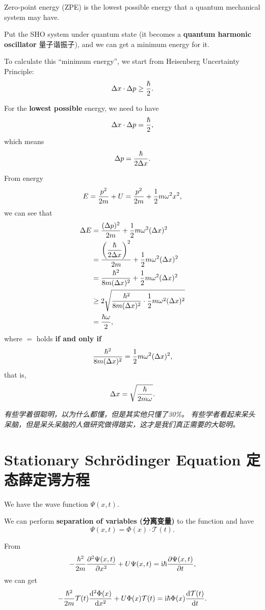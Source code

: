 Zero-point energy (ZPE) is the lowest possible energy that a quantum mechanical system may have.

Put the SHO system under quantum state (it becomes a \textbf{quantum harmonic oscillator} 量子谐振子), and we can get a minimum energy for it.

To calculate this ``minimum energy'', we start from Heisenberg Uncertainty Principle: \[\Delta x \cdot \Delta p \geq {\hbar \over 2}.\]

For the \textbf{lowest possible} energy, we need to have \[\Delta x \cdot \Delta p = {\hbar \over 2},\] which means \[\Delta p = {\hbar \over 2 \Delta x }.\]

From energy \[E = \dfrac{p^2}{2m}+ U = \dfrac{p^2}{2m} + {1 \over 2} m \omega^2 x^2,\] we can see that \begin{align*}
    \Delta E & = \dfrac{(\Delta p)^2}{2m} + {1 \over 2} m \omega^2 (\Delta x)^2 \\
    & = {{\left(\dfrac{\hbar}{ 2 \Delta x }\right)}^2 \over 2m} + {1 \over 2} m \omega^2 (\Delta x)^2 \\
    & = {\hbar^2 \over 8m(\Delta x)^2} + {1 \over 2} m \omega^2 (\Delta x)^2 \\
    & \geq 2 \sqrt{{\hbar^2 \over 8m(\Delta x)^2} \cdot {1 \over 2} m \omega^2 (\Delta x)^2} \\
    & = {\hbar \omega \over 2},
\end{align*} where \(=\) holds \textbf{if and only if} \[{\hbar^2 \over 8m(\Delta x)^2} = {1 \over 2} m \omega^2 (\Delta x)^2,\] that is, \[\Delta x = \sqrt{\hbar \over 2 m \omega}.\]

\emph{有些学着很聪明，以为什么都懂，但是其实他只懂了30\%。}
\emph{有些学者看起来呆头呆脑，但是呆头呆脑的人做研究做得踏实，这才是我们真正需要的大聪明。}

\section{Stationary Schrödinger Equation 定态薛定谔方程}\label{stationary-schruxf6dinger-equation-ux5b9aux6001ux859bux5b9aux8c14ux65b9ux7a0b}

We have the wave function \(\Psi(x, t)\).

We can perform \textbf{separation of variables (分离变量)} to the function and have \[\Psi(x, t) = \Phi(x) \cdot \mathcal{T}(t).\]

From \[-{ \hbar^2 \over 2m }{\partial^2 \Psi(x, t) \over \partial x ^2 } + U \Psi(x, t) =\mathrm i\hbar {\partial \Psi(x, t) \over \partial t},\] we can get \[-{ \hbar^2 \over 2m } \mathcal{T}(t){\mathrm d^2 \Phi(x) \over \mathrm d x ^2 } + U \Phi(x) \mathcal{T}(t) =\mathrm i\hbar \Phi(x) {\mathrm d \mathcal{T}(t) \over \mathrm d t}.\]

